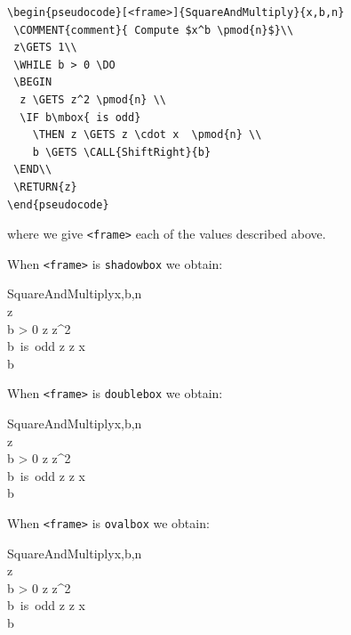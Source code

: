 \documentclass[a4]{article}
\begin{document}
\begin{verbatim}
\begin{pseudocode}[<frame>]{SquareAndMultiply}{x,b,n}
 \COMMENT{comment}{ Compute $x^b \pmod{n}$}\\
 z\GETS 1\\
 \WHILE b > 0 \DO
 \BEGIN
  z \GETS z^2 \pmod{n} \\
  \IF b\mbox{ is odd} 
    \THEN z \GETS z \cdot x  \pmod{n} \\
    b \GETS \CALL{ShiftRight}{b}
 \END\\
 \RETURN{z}
\end{pseudocode}
\end{verbatim}

\noindent{}where we give \verb+<frame>+  each of the values described above.

\medskip

\noindent When \verb+<frame>+ is \verb+shadowbox+ we obtain:

\begin{pseudocode}[shadowbox]{SquareAndMultiply}{x,b,n}
 \\
 z\\
 \WHILE b > 0 \DO
 \BEGIN
  z \GETS z^2  \\
  \IF b\mbox{ is odd} 
    \THEN z \GETS z \cdot x   \\
    b \GETS {}
 \END\\
\end{pseudocode}

\noindent When \verb+<frame>+ is \verb+doublebox+ we obtain:

\begin{pseudocode}[doublebox]{SquareAndMultiply}{x,b,n}
 \\
 z\\
 \WHILE b > 0 \DO
 \BEGIN
  z \GETS z^2  \\
  \IF b\mbox{ is odd} 
    \THEN z \GETS z \cdot x   \\
    b \GETS {}
 \END\\
\end{pseudocode}

\noindent When \verb+<frame>+ is \verb+ovalbox+ we obtain:

\begin{pseudocode}[ovalbox]{SquareAndMultiply}{x,b,n}
 \\
 z\\
 \WHILE b > 0 \DO
 \BEGIN
  z \GETS z^2  \\
  \IF b\mbox{ is odd} 
    \THEN z \GETS z \cdot x   \\
    b \GETS {}
 \END\\
\end{pseudocode}
\end{document}
